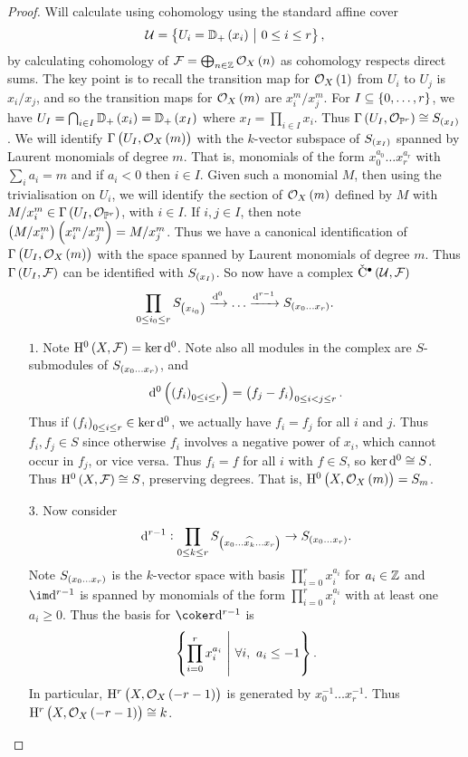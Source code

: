 \begin{proof}
Will calculate using \Cech cohomology using the standard affine cover
$$ \UUU = \cbr{U_i = \DD_+\br{x_i} \st 0 \le i \le r}, $$
by calculating cohomology of $ \FFF = \bigoplus_{n \in \ZZ} \OOO_X\br{n} $ as \Cech cohomology respects direct sums. The key point is to recall the transition map for $ \OOO_X\br{1} $ from $ U_i $ to $ U_j $ is $ x_i / x_j $, and so the transition maps for $ \OOO_X\br{m} $ are $ x_i^m / x_j^m $. For $ I \subseteq \cbr{0, \dots, r} $, we have $ U_I = \bigcap_{i \in I} \DD_+\br{x_i} = \DD_+\br{x_I} $ where $ x_I = \prod_{i \in I} x_i $. Thus $ \Gamma\br{U_I, \OOO_{\PP^r}} \cong S_{\br{x_I}} $. We will identify $ \Gamma\br{U_I, \OOO_X\br{m}} $ with the $ k $-vector subspace of $ S_{\br{x_I}} $ spanned by Laurent monomials of degree $ m $. That is, monomials of the form $ x_0^{a_0} \dots x_r^{a_r} $ with $ \sum_i a_i = m $ and if $ a_i < 0 $ then $ i \in I $. Given such a monomial $ M $, then using the trivialisation on $ U_i $, we will identify the section of $ \OOO_X\br{m} $ defined by $ M $ with $ M / x_i^m \in \Gamma\br{U_I, \OOO_{\PP^r}} $, with $ i \in I $. If $ i, j \in I $, then note $ \br{M / x_i^m}\br{x_i^m / x_j^m} = M / x_j^m $. Thus we have a canonical identification of $ \Gamma\br{U_I, \OOO_X\br{m}} $ with the space spanned by Laurent monomials of degree $ m $. Thus $ \Gamma\br{U_I, \FFF} $ can be identified with $ S_{\br{x_I}} $. So now have a \Cech complex $ \vC^\bullet\br{\UUU, \FFF} $
$$ \prod_{0 \le i_0 \le r} S_{\br{x_{i_0}}} \xrightarrow{\d^0} \dots \xrightarrow{\d^{r - 1}} S_{\br{x_0 \dots x_r}}. $$
\begin{itemize}
\item[$ 1 $.] Note $ \H^0\br{X, \FFF} = \ker \d^0 $. Note also all modules in the \Cech complex are $ S $-submodules of $ S_{\br{x_0 \dots x_r}} $, and
$$ \d^0\br{\br{f_i}_{0 \le i \le r}} = \br{f_j - f_i}_{0 \le i < j \le r}. $$
Thus if $ \br{f_i}_{0 \le i \le r} \in \ker \d^0 $, we actually have $ f_i = f_j $ for all $ i $ and $ j $. Thus $ f_i, f_j \in S $ since otherwise $ f_i $ involves a negative power of $ x_i $, which cannot occur in $ f_j $, or vice versa. Thus $ f_i = f $ for all $ i $ with $ f \in S $, so $ \ker \mathrm{d}^0 \cong S $. Thus $ \H^0\br{X, \FFF} \cong S $, preserving degrees. That is, $ \H^0\br{X, \OOO_X\br{m}} = S_m $.
\item[$ 3 $.] Now consider
$$ \d^{r - 1} : \prod_{0 \le k \le r} S_{\br{x_0 \dots \widehat{x_k} \dots x_r}} \to S_{\br{x_0 \dots x_r}}. $$
Note $ S_{\br{x_0 \dots x_r}} $ is the $ k $-vector space with basis $ \prod_{i = 0}^r x_i^{a_i} $ for $ a_i \in \mathbb{Z} $ and $ \im \d^{r - 1} $ is spanned by monomials of the form $ \prod_{i = 0}^r x_i^{a_i} $ with at least one $ a_i \ge 0 $. Thus the basis for $ \coker \d^{r - 1} $ is
$$ \cbr{\prod_{i = 0}^r x_i^{a_i} \st \forall i, \ a_i \le -1}. $$
In particular, $ \H^r\br{X, \OOO_X\br{-r - 1}} $ is generated by $ x_0^{-1} \dots x_r^{-1} $. Thus $ \H^r\br{X, \OOO_X\br{-r - 1}} \cong k $.


\end{itemize}
\end{proof}
